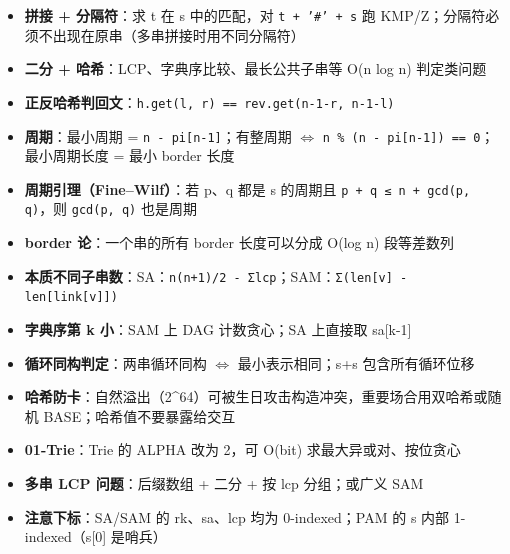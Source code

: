 \begin{itemize}
  \item \textbf{拼接 + 分隔符}：求 t 在 s 中的匹配，对 \texttt{t + '\#' + s} 跑 KMP/Z；分隔符必须不出现在原串（多串拼接时用不同分隔符）
  \item \textbf{二分 + 哈希}：LCP、字典序比较、最长公共子串等 O(n log n) 判定类问题
  \item \textbf{正反哈希判回文}：\texttt{h.get(l, r) == rev.get(n-1-r, n-1-l)}
  \item \textbf{周期}：最小周期 = \texttt{n - pi[n-1]}；有整周期 $\Leftrightarrow$ \texttt{n \% (n - pi[n-1]) == 0}；最小周期长度 = 最小 border 长度
  \item \textbf{周期引理（Fine–Wilf）}：若 p、q 都是 s 的周期且 \texttt{p + q ≤ n + gcd(p, q)}，则 \texttt{gcd(p, q)} 也是周期
  \item \textbf{border 论}：一个串的所有 border 长度可以分成 O(log n) 段等差数列
  \item \textbf{本质不同子串数}：SA：\texttt{n(n+1)/2 - Σlcp}；SAM：\texttt{Σ(len[v] - len[link[v]])}
  \item \textbf{字典序第 k 小}：SAM 上 DAG 计数贪心；SA 上直接取 sa[k-1]
  \item \textbf{循环同构判定}：两串循环同构 $\Leftrightarrow$ 最小表示相同；s+s 包含所有循环位移
  \item \textbf{哈希防卡}：自然溢出（2\textasciicircum{}64）可被生日攻击构造冲突，重要场合用双哈希或随机 BASE；哈希值不要暴露给交互
  \item \textbf{01-Trie}：Trie 的 ALPHA 改为 2，可 O(bit) 求最大异或对、按位贪心
  \item \textbf{多串 LCP 问题}：后缀数组 + 二分 + 按 lcp 分组；或广义 SAM
  \item \textbf{注意下标}：SA/SAM 的 rk、sa、lcp 均为 0-indexed；PAM 的 s 内部 1-indexed（s[0] 是哨兵）
\end{itemize}
